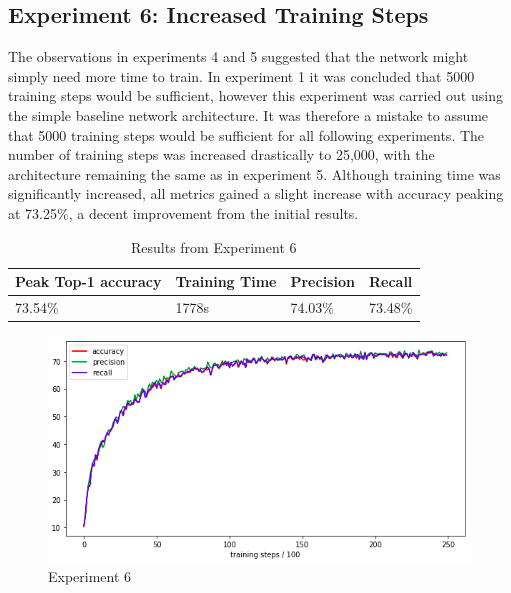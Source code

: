 \documentclass[12pt]{report}
\begin{document}
\clearpage
\begin{flushleft}
\vspace{0.5cm}
\section{Experiment 6: Increased Training Steps}
The observations in experiments 4 and 5 suggested that the network might simply need more time to train. In experiment 1 it was concluded that 5000 training steps would be sufficient, however this experiment was carried out using the simple baseline network architecture. It was therefore a mistake to assume that 5000 training steps would be sufficient for all following experiments. The number of training steps was increased drastically to 25,000, with the architecture remaining the same as in experiment 5. Although training time was significantly increased, all metrics gained a slight increase with accuracy peaking at 73.25\%, a decent improvement from the initial results.

\vspace{0.5cm}
\begin{table}[ht!]
\begin{tabular}{llll}
\\ \hline
\multicolumn{1}{|l|}{Peak Top-1 accuracy} & \multicolumn{1}{l|}{Training Time} & \multicolumn{1}{l|}{Precision} & \multicolumn{1}{l|}{Recall}  \\ \hline
\multicolumn{1}{|l|}{73.54\%}             & \multicolumn{1}{l|}{1778s}         & \multicolumn{1}{l|}{74.03\%}   & \multicolumn{1}{l|}{73.48\%} \\ \hline
\end{tabular}
\caption{Results from Experiment 6}
\end{table}

\vspace{0.5cm}
\begin{figure}[ht!]
	\centering
	\includegraphics[width=12cm]{experiment-6}
	\caption{Experiment 6}
	\label{fig:experiment-6}
\end{figure}

\end{flushleft}
\end{document}

